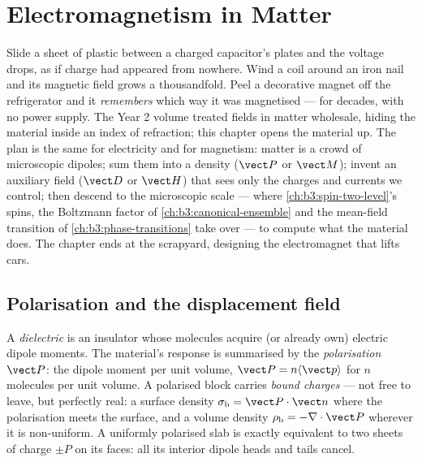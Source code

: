 \chapter{Electromagnetism in Matter}\label{ch:b3:electromagnetism-in-matter}


Slide a sheet of plastic between a charged capacitor's plates and the
voltage drops, as if charge had appeared from nowhere. Wind a coil
around an iron nail and its magnetic field grows a thousandfold. Peel
a decorative magnet off the refrigerator and it \emph{remembers} which
way it was magnetised --- for decades, with no power supply. The Year 2
volume treated fields in matter wholesale, hiding the material inside
an index of refraction; this chapter opens the material up. The plan
is the same for electricity and for magnetism: matter is a crowd of
microscopic dipoles; sum them into a density ($\vect P$ or $\vect M$);
invent an auxiliary field ($\vect D$ or $\vect H$) that sees only the
charges and currents we control; then descend to the microscopic scale
--- where \cref{ch:b3:spin-two-level}'s spins, the Boltzmann factor of
\cref{ch:b3:canonical-ensemble} and the mean-field transition of
\cref{ch:b3:phase-transitions} take over --- to compute what the
material does. The chapter ends at the scrapyard, designing the
electromagnet that lifts cars.

\section{Polarisation and the displacement field}

\begin{definition}\label{def:b3:electromagnetism-in-matter:polarisation}
A \emph{dielectric} is an insulator whose molecules acquire (or
already own) electric dipole moments. The material's response is
summarised by the \emph{polarisation} $\vect P$: the dipole moment
per unit volume, $\vect P = n\langle\vect p\rangle$ for $n$ molecules
per unit volume. A polarised block carries \emph{bound charges} ---
not free to leave, but perfectly real: a surface density
$\sigma_{\text{b}} = \vect P\cdot\vect n$ where the polarisation
meets the surface, and a volume density $\rho_{\text{b}} =
-\nabla\cdot\vect P$ wherever it is non-uniform. A uniformly
polarised slab is exactly equivalent to two sheets of charge $\pm P$
on its faces: all its interior dipole heads and tails cancel.
\end{definition}

